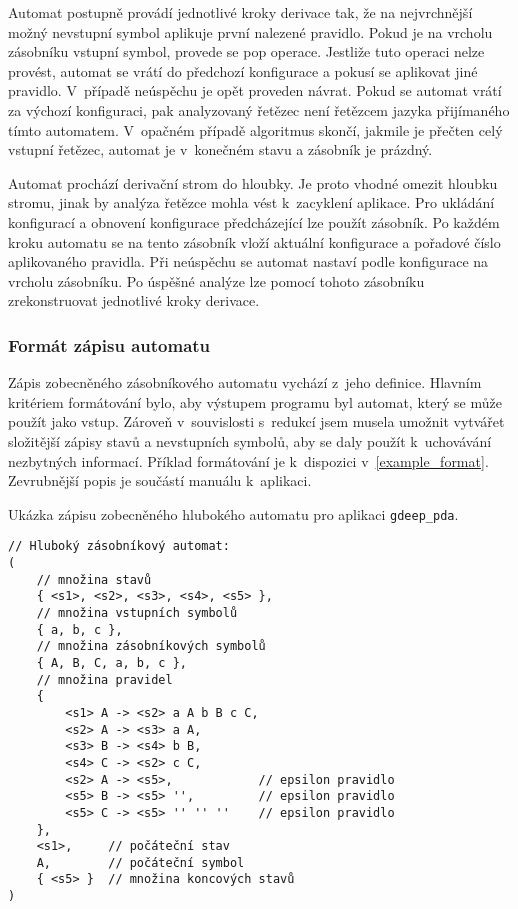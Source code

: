 Automat postupně provádí jednotlivé kroky derivace tak, že na nejvrchnější možný nevstupní symbol aplikuje první nalezené pravidlo. Pokud je na vrcholu zásobníku vstupní symbol, provede se pop operace. Jestliže tuto operaci nelze provést, automat se vrátí do předchozí konfigurace a pokusí se aplikovat jiné pravidlo. V~případě neúspěchu je opět proveden návrat. Pokud se automat vrátí za výchozí konfiguraci, pak analyzovaný řetězec není řetězcem jazyka přijímaného tímto automatem. V~opačném případě algoritmus skončí, jakmile je přečten celý vstupní řetězec, automat je v~konečném stavu a zásobník je prázdný.

Automat prochází derivační strom do hloubky. Je proto vhodné omezit hloubku stromu, jinak by analýza řetězce mohla vést k~zacyklení aplikace. Pro ukládání konfigurací a obnovení konfigurace předcházející lze použít zásobník. Po každém kroku automatu se na tento zásobník vloží aktuální konfigurace a pořadové číslo aplikovaného pravidla. Při neúspěchu se automat nastaví podle konfigurace na vrcholu zásobníku. Po úspěšné analýze lze pomocí tohoto zásobníku zrekonstruovat jednotlivé kroky derivace.

\subsubsection{Formát zápisu automatu}\label{kap_aplikace_format}

Zápis zobecněného zásobníkového automatu vychází z~jeho definice. Hlavním kritériem formátování bylo, aby výstupem programu byl automat, který se může použít jako vstup. Zároveň v~souvislosti s~redukcí jsem musela umožnit vytvářet složitější zápisy stavů a nevstupních symbolů, aby se daly použít k~uchovávání nezbytných informací. Příklad formátování je k~dispozici v~\ref{example_format}. Zevrubnější popis je součástí manuálu k~aplikaci.

\begin{Example} \label{example_format}
Ukázka zápisu zobecněného hlubokého automatu pro aplikaci \texttt{gdeep\_pda}.

\begin{verbatim}
// Hluboký zásobníkový automat:
(
    // množina stavů
    { <s1>, <s2>, <s3>, <s4>, <s5> },
    // množina vstupních symbolů
    { a, b, c },
    // množina zásobníkových symbolů
    { A, B, C, a, b, c },
    // množina pravidel
    { 
        <s1> A -> <s2> a A b B c C,
        <s2> A -> <s3> a A,
        <s3> B -> <s4> b B,
        <s4> C -> <s2> c C,
        <s2> A -> <s5>,            // epsilon pravidlo
        <s5> B -> <s5> '',         // epsilon pravidlo
        <s5> C -> <s5> '' '' ''    // epsilon pravidlo
    },
    <s1>,     // počáteční stav
    A,        // počáteční symbol
    { <s5> }  // množina koncových stavů	
)
\end{verbatim}
\end{Example}

